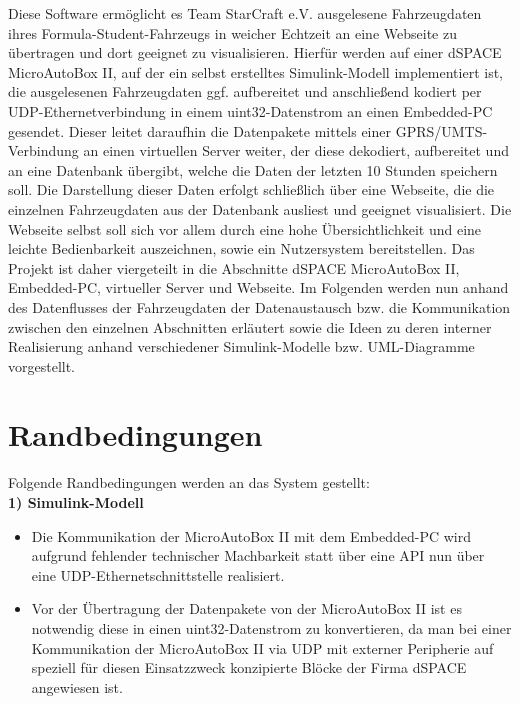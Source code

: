 \documentclass[fontsize = 12pt, paper = a4]{scrreprt}
\begin{document}
Diese Software ermöglicht es Team StarCraft e.V. ausgelesene Fahrzeugdaten ihres Formula-Student-Fahrzeugs in weicher Echtzeit an eine Webseite zu übertragen und dort geeignet zu visualisieren. Hierfür werden auf einer dSPACE MicroAutoBox II, auf der ein selbst erstelltes Simulink-Modell implementiert ist, die ausgelesenen Fahrzeugdaten ggf. auf\-be\-reitet und anschließend kodiert per UDP-Ethernetverbindung in einem uint32-Datenstrom an einen Embedded-PC gesendet. Dieser leitet daraufhin die Datenpakete mittels einer GPRS/UMTS-Verbindung an einen virtuellen Server weiter, der diese dekodiert, aufbereitet und an eine Datenbank übergibt, welche die Daten der letzten 10 Stunden speichern soll. Die Darstellung dieser Daten erfolgt schließlich über eine Webseite, die die einzelnen Fahrzeugdaten aus der Datenbank ausliest und geeignet visualisiert. Die Webseite selbst soll sich vor allem durch eine hohe Übersichtlichkeit und eine leichte Bedienbarkeit auszeichnen, sowie ein Nutzersystem bereitstellen. Das Projekt ist daher viergeteilt in die Abschnitte dSPACE MicroAutoBox II, Embedded-PC, virtueller Server und Webseite. Im Folgenden werden nun anhand des Datenflusses der Fahrzeugdaten der Datenaustausch bzw. die Kommunikation zwischen den einzelnen Abschnitten erläutert sowie die Ideen zu deren interner Realisierung anhand verschiedener Simulink-Modelle bzw. UML-Diagramme vorgestellt.


\chapter{Randbedingungen} 

Folgende Randbedingungen werden an das System gestellt: \\

\textbf{1) Simulink-Modell} 

\begin{itemize}

\item Die Kommunikation der MicroAutoBox II mit dem Embedded-PC wird aufgrund fehlender technischer Machbarkeit statt über eine API nun über eine UDP-Ethernet\-schnittstelle realisiert.


\item Vor der Übertragung der Datenpakete von der MicroAutoBox II ist es notwendig diese in einen uint32-Datenstrom zu konvertieren, da man bei einer Kommunikation der MicroAutoBox II via UDP mit externer Peripherie auf speziell für diesen Einsatzzweck konzipierte Blöcke der Firma dSPACE angewiesen ist. \\

\end{itemize}
\end{document}
